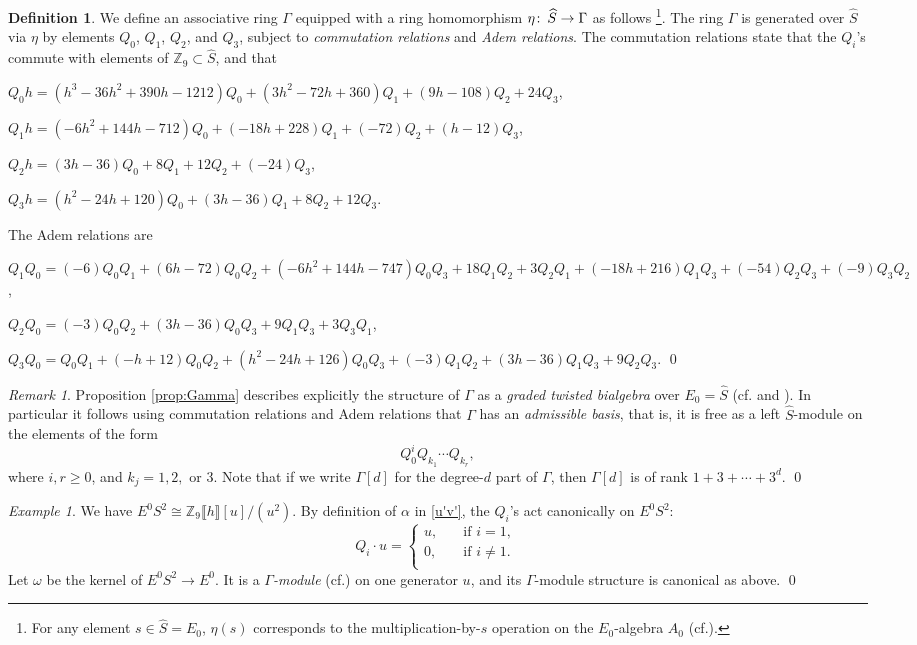 \documentclass{gtpart}
\theoremstyle{definition}
\newtheorem{defn}[thm]{Definition}
\theoremstyle{remark}
\newtheorem{rmk}[thm]{Remark}
\newtheorem{exam}[thm]{Example}
\def\co{\colon\thinspace}
\newcommand{\mb}[1]{\mathbb{#1}}
\newcommand{\cff}[2]{cf.\thinspace{\cite[#1]{#2}}}
\newcommand{\BZ}{{\mb Z}}
\newcommand{\HS}{\widehat{S}}
\newcommand{\A}{\alpha}
\newcommand{\G}{\Gamma}
\begin{document}
\begin{defn}
\label{def}
 We define an associative ring $\G$ equipped with a ring homomorphism $\eta \co \HS \to \G$ as follows 
 \footnote{For any element $s \in \HS = E_0$, $\eta(s)$ corresponds to the multiplication-by-$s$ operation on the $E_0$-algebra $A_0$ (\cff{Section 6}{cong}).  }.  
 The ring $\G$ is generated over $\HS$ via $\eta$ by elements $Q_0$, $Q_1$, $Q_2$, and $Q_3$, subject to {\em commutation relations} and {\em Adem relations}.  
 The commutation relations state that the $Q_i$'s commute with elements of $\BZ_9 \subset \HS$, and that 

 $Q_0 h = (h^3 - 36 h^2 + 390 h - 1212) Q_0 + (3 h^2 - 72 h + 360) Q_1 + (9 h - 108) Q_2 + 24 Q_3$, 

 $Q_1 h = (-6 h^2 + 144 h - 712) Q_0 + (-18 h + 228) Q_1 + (-72) Q_2 + (h - 12) Q_3$, 

 $Q_2 h = (3 h - 36) Q_0 + 8 Q_1 + 12 Q_2 + (-24) Q_3$, 

 $Q_3 h = (h^2 - 24 h + 120) Q_0 + (3 h - 36) Q_1 + 8 Q_2 + 12 Q_3$.  

 The Adem relations are 

 $Q_1Q_0 = (-6) Q_0Q_1 + (6 h - 72) Q_0Q_2 + (-6 h^2 + 144 h - 747) Q_0Q_3 + 18 Q_1Q_2 + 3 Q_2Q_1 + (-18 h + 216) Q_1Q_3 + (-54) Q_2Q_3 + (-9) Q_3Q_2$, 

 $Q_2Q_0 = (-3) Q_0Q_2 + (3 h - 36) Q_0Q_3 + 9 Q_1Q_3 + 3 Q_3Q_1$, 

 $Q_3Q_0 = Q_0Q_1 + (-h + 12) Q_0Q_2 + (h^2 - 24 h + 126) Q_0Q_3 + (-3) Q_1Q_2 + (3 h - 36) Q_1Q_3 + 9 Q_2Q_3$.  
\qed
\end{defn}

\begin{rmk}
\label{rmk:rank}
 Proposition \ref{prop:Gamma} describes explicitly the structure of $\G$ as a {\em graded twisted bialgebra} over $E_0 = \HS$ (\cff{Section 5}{cong} and \cite[2.1]{h2p2}).  
 In particular it follows using commutation relations and Adem relations that $\G$ has an {\em admissible basis}, 
 that is, it is free as a left $\HS$-module on the elements of the form 
 \[
  Q_0^i Q_{k_1} \cdots Q_{k_r}, 
 \]
 where $i, r \geq 0$, and $k_j = 1, 2,$ or 3.  
 Note that if we write $\G[d]$ for the degree-$d$ part of $\G$, then $\G[d]$ is of rank $1 + 3 + \cdots + 3^d$.  
\qed
\end{rmk}

\begin{exam}
\label{ex:omega}
 We have $E^0 S^2 \cong \BZ_9 \llbracket h \rrbracket [u] / (u^2)$.  
 By definition of $\A$ in \eqref{u'v'}, the $Q_i$'s act canonically on $E^0 S^2$: 
 \[
  Q_i \cdot u = \left\{
  \begin{array}{ll}
    u,  & \quad \text{if $i = 1$, }\\
    0,  & \quad \text{if $i \neq 1$.  }\\
  \end{array}
  \right.
 \]
 Let $\omega$ be the kernel of $E^0 S^2 \to E^0$.  It is a {\em $\G$-module} (\cff{2.2}{h2p2}) on one generator $u$, and its $\G$-module structure is canonical as above.  
\qed
\end{exam}
\end{document}

